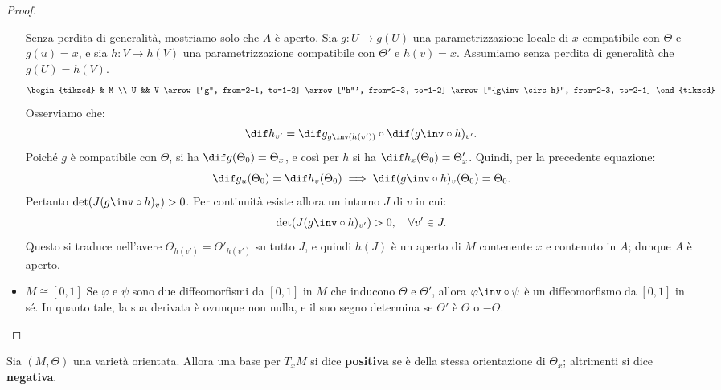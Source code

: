 \begin{multicols*}{2}
\begin{proof}
\begin{itemize}
                  Senza perdita di generalità, mostriamo solo che $A$ è aperto. Sia
                  $g : U \to g(U)$ una parametrizzazione locale di $x$ compatibile con $\Theta$ e $g(u) = x$, e sia $h : V \to h(V)$
                  una parametrizzazione compatibile con $\Theta'$ e $h(v) = x$. Assumiamo senza perdita di generalità che $g(U) = h(V)$.
                  \[\begin{tikzcd}
                          & M \\
                          U && V
                          \arrow["g", from=2-1, to=1-2]
                          \arrow["h"', from=2-3, to=1-2]
                          \arrow["{g\inv \circ h}", from=2-3, to=2-1]
                      \end{tikzcd}\]
                  Osserviamo che:
                  \[
                      \dif h_{v'} = \dif g_{g\inv(h(v'))} \circ \dif (g\inv \circ h)_{v'}.
                  \]
                  Poiché $g$ è compatibile con $\Theta$, si ha $\dif g(\Theta_0) = \Theta_x$, e così
                  per $h$ si ha $\dif h_x(\Theta_0) = \Theta'_x$. Quindi, per la precedente equazione:
                  \[
                      \dif g_u(\Theta_0) = \dif h_v(\Theta_0) \implies \dif (g\inv \circ h)_v (\Theta_0) = \Theta_0.
                  \]
                  Pertanto $\det(J(g\inv \circ h)_v) > 0$. Per continuità esiste allora un intorno $J$ di $v$ in cui:
                  \[
                      \det(J(g\inv \circ h)_{v'}) > 0, \quad \forall v' \in J.
                  \]
                  Questo si traduce nell'avere $\Theta_{h(v')} = \Theta'_{h(v')}$ su tutto $J$, e quindi
                  $h(J)$ è un aperto di $M$ contenente $x$ e contenuto in $A$; dunque $A$ è aperto.

            \item $\boxed{M \cong [0, 1]}$ Se $\varphi$ e $\psi$ sono due diffeomorfismi da $[0, 1]$ in $M$ che inducono
                  $\Theta$ e $\Theta'$, allora $\varphi\inv \circ \psi$ è un diffeomorfismo da $[0, 1]$ in sé. In quanto
                  tale, la sua derivata è ovunque non nulla, e il suo segno determina se $\Theta'$ è $\Theta$ o $-\Theta$.
        \end{itemize}
    \end{proof}

    \begin{definition}
        Sia $(M, \Theta)$ una varietà orientata. Allora una base per $T_x M$ si dice
        \textbf{positiva} se è della stessa orientazione di $\Theta_x$; altrimenti
        si dice \textbf{negativa}.
    \end{definition}


\end{multicols*}
